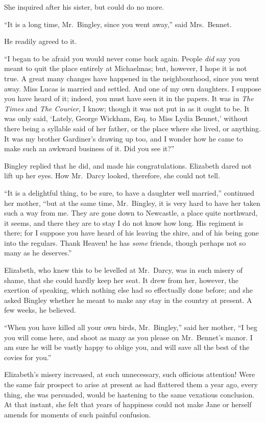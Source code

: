 She inquired after his sister, but could do no more.

``It is a long time, Mr.\ Bingley, since you went away,'' said
Mrs.\ Bennet.

He readily agreed to it.

``I began to be afraid you would never come back again.  People
\emph{did} say you meant to quit the place entirely at Michaelmas;
but, however, I hope it is not true.  A great many changes have
happened in the neighbourhood, since you went away.  Miss Lucas
is married and settled.  And one of my own daughters.  I suppose
you have heard of it; indeed, you must have seen it in the
papers.  It was in \emph{The Times} and \emph{The Courier}, I know; though
it was not put in as it ought to be.  It was only said, `Lately,
George Wickham, Esq. to Miss Lydia Bennet,' without there being
a syllable said of her father, or the place where she lived, or
anything.  It was my brother Gardiner's drawing up too, and I
wonder how he came to make such an awkward business of it.  Did
you see it?''

Bingley replied that he did, and made his congratulations.
Elizabeth dared not lift up her eyes.  How Mr.\ Darcy looked,
therefore, she could not tell.

``It is a delightful thing, to be sure, to have a daughter
well married,'' continued her mother, ``but at the same time,
Mr.\ Bingley, it is very hard to have her taken such a way from
me.  They are gone down to Newcastle, a place quite northward,
it seems, and there they are to stay I do not know how long.
His regiment is there; for I suppose you have heard of his
leaving the \gdash{}shire, and of his being gone into the regulars.
Thank Heaven! he has \emph{some} friends, though perhaps not so
many as he deserves.''

Elizabeth, who knew this to be levelled at Mr.\ Darcy, was
in such misery of shame, that she could hardly keep her seat.
It drew from her, however, the exertion of speaking, which
nothing else had so effectually done before; and she asked
Bingley whether he meant to make any stay in the country at
present.  A few weeks, he believed.

``When you have killed all your own birds, Mr.\ Bingley,''
said her mother, ``I beg you will come here, and shoot as
many as you please on Mr.\ Bennet's manor.  I am sure he
will be vastly happy to oblige you, and will save all the
best of the covies for you.''

Elizabeth's misery increased, at such unnecessary, such
officious attention!  Were the same fair prospect to arise at
present as had flattered them a year ago, every thing, she was
persuaded, would be hastening to the same vexatious conclusion.
At that instant, she felt that years of happiness could not
make Jane or herself amends for moments of such painful
confusion.

